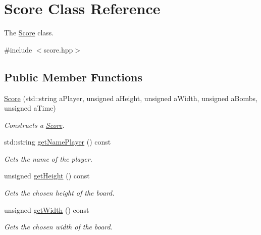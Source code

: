 \hypertarget{class_score}{}\section{Score Class Reference}
\label{class_score}


The \hyperlink{class_score}{Score} class.  




{\ttfamily \#include $<$score.\+hpp$>$}

\subsection*{Public Member Functions}
\begin{DoxyCompactItemize}
\item 
\hyperlink{class_score_aca56f92c41af4c535ab008fbe09cdb03}{Score} (std\+::string a\+Player, unsigned a\+Height, unsigned a\+Width, unsigned a\+Bombs, unsigned a\+Time)
\begin{DoxyCompactList}\small\item\em Constructs a \hyperlink{class_score}{Score}. \end{DoxyCompactList}\item 
std\+::string \hyperlink{class_score_ab84d1934f656ed3d6486fdab859a055c}{get\+Name\+Player} () const
\begin{DoxyCompactList}\small\item\em Gets the name of the player. \end{DoxyCompactList}\item 
\mbox{\label{class_score_ab6f5cf35d87741c9d3bfa245007bdef1}} 
unsigned \hyperlink{class_score_ab6f5cf35d87741c9d3bfa245007bdef1}{get\+Height} () const
\begin{DoxyCompactList}\small\item\em Gets the chosen height of the board. \end{DoxyCompactList}\item 
\mbox{\label{class_score_a8e03355b01cd26efed750fa0fff20c74}} 
unsigned \hyperlink{class_score_a8e03355b01cd26efed750fa0fff20c74}{get\+Width} () const
\begin{DoxyCompactList}\small\item\em Gets the chosen width of the board. \end{DoxyCompactList}\item 
\mbox{\label{class_score_aaf978efb756da9165def7dc8423cb16a}} 

\end{DoxyCompactItemize}
